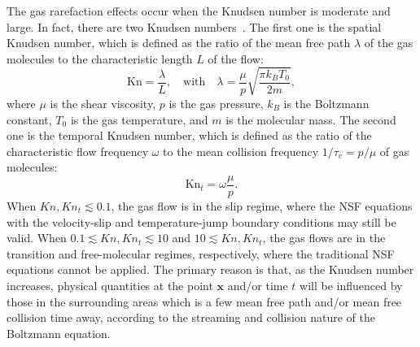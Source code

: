 \documentclass[lineno]{jfm}
\begin{document}
The gas rarefaction effects occur when the Knudsen number is moderate and large.   In fact, there are two Knudsen numbers~\citep{Lei2022}. The first one is the spatial Knudsen number, which is defined as the ratio of the mean free path $\lambda$ of the gas molecules to the characteristic length $L$ of the flow:
\begin{equation}\label{Kn_original}
	\text{Kn}=\frac{\lambda}{L}, \quad\text{with}\quad
	\lambda=\frac{\mu}{p}\sqrt{\frac{\pi{}k_BT_0}{2m}},
\end{equation}
where $\mu$ is the shear viscosity, $p$ is the gas pressure, $k_B$ is the Boltzmann constant, $T_0$ is the gas temperature, and $m$ is the molecular mass. The second one is the temporal Knudsen number, which is defined as the ratio of the characteristic flow frequency $\omega$ to the mean collision frequency $1/\tau_c=p/\mu$ of gas molecules:
\begin{equation}\label{Kn_temporal}
	\text{Kn}_t=\omega\frac{\mu}{p}.
\end{equation}
When $Kn, Kn_t\lesssim0.1$, the gas flow is in the slip regime, where the NSF equations with the velocity-slip and temperature-jump boundary conditions may still be valid. When $0.1\lesssim Kn, Kn_t\lesssim10$ and $10\lesssim Kn, Kn_t$, the gas flows are in the transition and free-molecular regimes, respectively, where the traditional NSF equations cannot be applied. The primary reason is that, as the Knudsen number increases,  physical quantities at the point $\bm{x}$ and/or time $t$ will be influenced by those in the surrounding areas which is a few mean free path and/or mean free collision time away, according to the streaming and collision nature of the Boltzmann equation.

\end{document}
